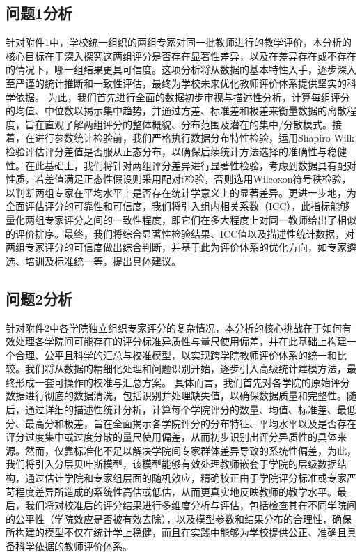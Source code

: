 \documentclass[withoutpreface,bwprint]{cumcmthesis}
\begin{document}
\subsection{问题1分析}
针对附件1中，学校统一组织的两组专家对同一批教师进行的教学评价，本分析的核心目标在于深入探究这两组评分是否存在显著性差异，以及在差异存在或不存在的情况下，哪一组结果更具可信度。这项分析将从数据的基本特性入手，逐步深入至严谨的统计推断和一致性评估，最终为学校未来优化教师评价体系提供坚实的科学依据。
为此，我们首先进行全面的数据初步审视与描述性分析，计算每组评分的均值、中位数以揭示集中趋势，并通过方差、标准差和极差来衡量数据的离散程度，旨在直观了解两组评分的整体概貌、分布范围及潜在的集中/分散模式。接着，在进行参数统计检验前，我们严格执行数据分布特性检验，运用Shapiro-Wilk检验评估评分差值是否服从正态分布，以确保后续统计方法选择的准确性与稳健性。在此基础上，我们将针对两组评分差异进行显著性检验，考虑到数据具有配对性质，若差值满足正态性假设则采用配对t检验，否则选用Wilcoxon符号秩检验，以判断两组专家在平均水平上是否存在统计学意义上的显著差异。更进一步地，为全面评估评分的可靠性和可信度，我们将引入组内相关系数（ICC），此指标能够量化两组专家评分之间的一致性程度，即它们在多大程度上对同一教师给出了相似的评价排序。最终，我们将综合显著性检验结果、ICC值以及描述性统计数据，对两组专家评分的可信度做出综合判断，并基于此为评价体系的优化方向，如专家遴选、培训及标准统一等，提出具体建议。

\subsection{问题2分析}	
针对附件2中各学院独立组织专家评分的复杂情况，本分析的核心挑战在于如何有效处理各学院间可能存在的评分标准异质性与量尺使用偏差，并在此基础上构建一个合理、公平且科学的汇总与校准模型，以实现跨学院教师评价体系的统一和比较。我们将从数据的精细化处理和问题识别开始，逐步引入高级统计建模方法，最终形成一套可操作的校准与汇总方案。
具体而言，我们首先对各学院的原始评分数据进行彻底的数据清洗，包括识别并处理缺失值，以确保数据质量和完整性。随后，通过详细的描述性统计分析，计算每个学院评分的数量、均值、标准差、最低分、最高分和极差，旨在全面揭示各学院评分的分布特征、平均水平以及是否存在评分过度集中或过度分散的量尺使用偏差，从而初步识别出评分异质性的具体来源。然而，仅靠标准化不足以解决学院间专家群体差异导致的系统性偏差，为此，我们将引入分层贝叶斯模型，该模型能够有效处理教师嵌套于学院的层级数据结构，通过估计学院和专家组层面的随机效应，精确校正由于学院评分标准或专家严苛程度差异所造成的系统性高估或低估，从而更真实地反映教师的教学水平。最后，我们将对校准后的评分结果进行多维度分析与评估，包括检查其在不同学院间的公平性（学院效应是否被有效去除），以及模型参数和结果分布的合理性，确保所构建的模型不仅在统计学上稳健，而且在实践中能够为学校提供公正、准确且具备科学依据的教师评价体系。
\end{document}
